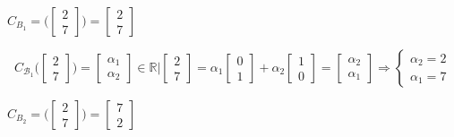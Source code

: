 $C_{B_1}=\Bigg(
\begin{bmatrix}
    2\\7
\end{bmatrix}
\Bigg)= 
\begin{bmatrix}
    2\\7
\end{bmatrix}
$

\[
    C_{\mathcal{B}_1}\Bigg( 
    \begin{bmatrix}  
        2\\7
    \end{bmatrix}  
    \Bigg)
    = 
    \begin{bmatrix}
        \alpha_1\\
        \alpha_2
    \end{bmatrix}
    \in\mathbb{R}\Big| 
    \begin{bmatrix}
        2\\7
    \end{bmatrix}
    =\alpha_1
    \begin{bmatrix}
        0\\1
    \end{bmatrix}
    +\alpha_2
    \begin{bmatrix}
        1\\0
    \end{bmatrix}
    = 
    \begin{bmatrix}
        \alpha_2\\\alpha_1
    \end{bmatrix}
    \Longrightarrow
    \begin{cases}
        \alpha_2=2\\
        \alpha_1=7
    \end{cases}
\]

$C_{B_2}=\Bigg(
\begin{bmatrix}
    2\\7
\end{bmatrix}
\Bigg)= 
\begin{bmatrix}
    7\\2
\end{bmatrix}
$




